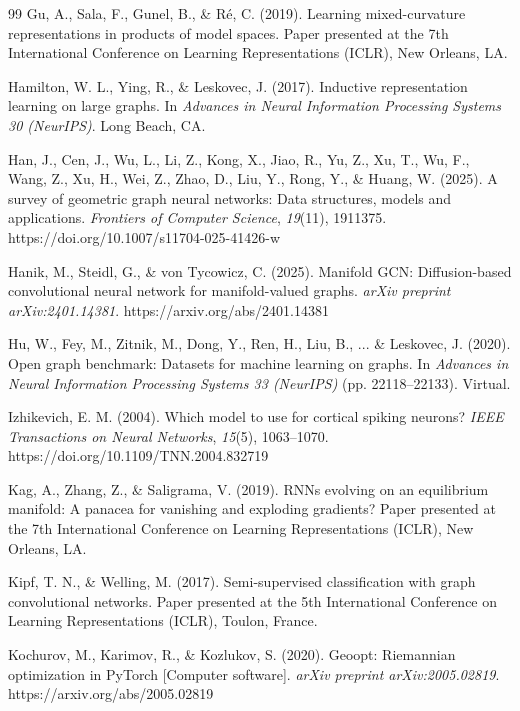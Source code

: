 \documentclass[a4paper,fleqn]{cas-dc}
\begin{document}
\begin{thebibliography}{99}
Gu, A., Sala, F., Gunel, B., \& R\'e, C. (2019). Learning mixed-curvature representations in products of model spaces. Paper presented at the 7th International Conference on Learning Representations (ICLR), New Orleans, LA.

Hamilton, W. L., Ying, R., \& Leskovec, J. (2017). Inductive representation learning on large graphs. In \textit{Advances in Neural Information Processing Systems 30 (NeurIPS)}. Long Beach, CA.

Han, J., Cen, J., Wu, L., Li, Z., Kong, X., Jiao, R., Yu, Z., Xu, T., Wu, F., Wang, Z., Xu, H., Wei, Z., Zhao, D., Liu, Y., Rong, Y., \& Huang, W. (2025). A survey of geometric graph neural networks: Data structures, models and applications. \textit{Frontiers of Computer Science}, \textit{19}(11), 1911375. https://doi.org/10.1007/s11704-025-41426-w

Hanik, M., Steidl, G., \& von Tycowicz, C. (2025). Manifold GCN: Diffusion-based convolutional neural network for manifold-valued graphs. \textit{arXiv preprint arXiv:2401.14381}. https://arxiv.org/abs/2401.14381

Hu, W., Fey, M., Zitnik, M., Dong, Y., Ren, H., Liu, B., ... \& Leskovec, J. (2020). Open graph benchmark: Datasets for machine learning on graphs. In \textit{Advances in Neural Information Processing Systems 33 (NeurIPS)} (pp. 22118--22133). Virtual.

Izhikevich, E. M. (2004). Which model to use for cortical spiking neurons? \textit{IEEE Transactions on Neural Networks}, \textit{15}(5), 1063--1070. https://doi.org/10.1109/TNN.2004.832719

Kag, A., Zhang, Z., \& Saligrama, V. (2019). RNNs evolving on an equilibrium manifold: A panacea for vanishing and exploding gradients? Paper presented at the 7th International Conference on Learning Representations (ICLR), New Orleans, LA.

Kipf, T. N., \& Welling, M. (2017). Semi-supervised classification with graph convolutional networks. Paper presented at the 5th International Conference on Learning Representations (ICLR), Toulon, France.

Kochurov, M., Karimov, R., \& Kozlukov, S. (2020). Geoopt: Riemannian optimization in PyTorch [Computer software]. \textit{arXiv preprint arXiv:2005.02819}. https://arxiv.org/abs/2005.02819


\end{thebibliography}
\end{document}
